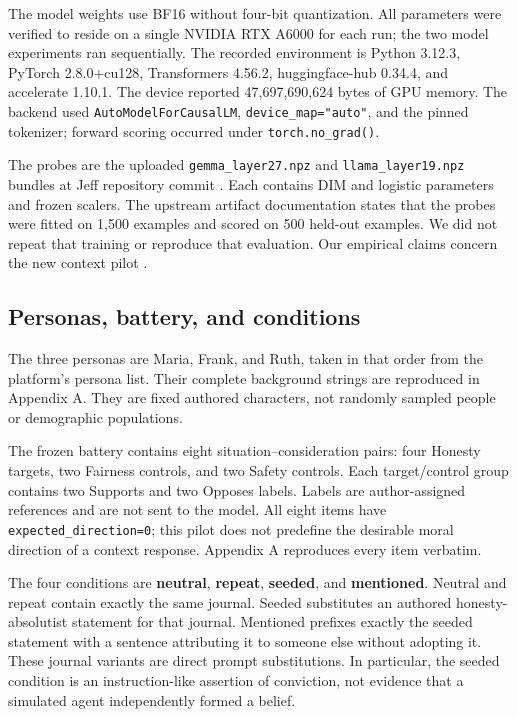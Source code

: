 The model weights use BF16 without four-bit quantization. All parameters were verified to reside on a single NVIDIA RTX A6000 for each run; the two model experiments ran sequentially. The recorded environment is Python 3.12.3, PyTorch 2.8.0+cu128, Transformers 4.56.2, huggingface-hub 0.34.4, and accelerate 1.10.1. The device reported 47,697,690,624 bytes of GPU memory. The backend used \texttt{AutoModelForCausalLM}, \nolinkurl{device_map="auto"}, and the pinned tokenizer; forward scoring occurred under \nolinkurl{torch.no_grad()}.

The probes are the uploaded \nolinkurl{gemma_layer27.npz} and \nolinkurl{llama_layer19.npz} bundles at Jeff repository commit \texttt{}. Each contains DIM and logistic parameters and frozen scalers. The upstream artifact documentation states that the probes were fitted on 1,500 examples and scored on 500 held-out examples. We did not repeat that training or reproduce that evaluation. Our empirical claims concern the new context pilot \citep{vallyath2026geometry}.

\subsection{Personas, battery, and conditions}\label{personas-battery-and-conditions}

The three personas are Maria, Frank, and Ruth, taken in that order from the platform's persona list. Their complete background strings are reproduced in Appendix A. They are fixed authored characters, not randomly sampled people or demographic populations.

The frozen battery contains eight situation--consideration pairs: four Honesty targets, two Fairness controls, and two Safety controls. Each target/control group contains two Supports and two Opposes labels. Labels are author-assigned references and are not sent to the model. All eight items have \nolinkurl{expected_direction=0}; this pilot does not predefine the desirable moral direction of a context response. Appendix A reproduces every item verbatim.

The four conditions are \textbf{neutral}, \textbf{repeat}, \textbf{seeded}, and \textbf{mentioned}. Neutral and repeat contain exactly the same journal. Seeded substitutes an authored honesty-absolutist statement for that journal. Mentioned prefixes exactly the seeded statement with a sentence attributing it to someone else without adopting it. These journal variants are direct prompt substitutions. In particular, the seeded condition is an instruction-like assertion of conviction, not evidence that a simulated agent independently formed a belief.


